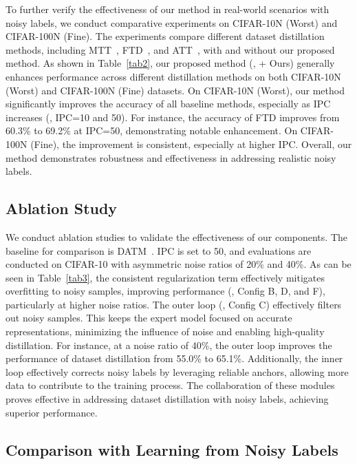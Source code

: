 
To further verify the effectiveness of our method in real-world scenarios with noisy labels, we conduct comparative experiments on CIFAR-10N (Worst) and CIFAR-100N (Fine).
The experiments compare different dataset distillation methods, including MTT~\cite{cazenavette2022distillation}, FTD~\cite{du2023minimizing}, and ATT~\cite{liu2024dataset}, with and without our proposed method.
As shown in Table~\ref{tab2}, our proposed method (\ie, + Ours) generally enhances performance across different distillation methods on both CIFAR-10N (Worst) and CIFAR-100N (Fine) datasets.
On CIFAR-10N (Worst), our method significantly improves the accuracy of all baseline methods, especially as IPC increases (\eg, IPC=10 and 50). 
For instance, the accuracy of FTD improves from 60.3\% to 69.2\% at IPC=50, demonstrating notable enhancement.
On CIFAR-100N (Fine), the improvement is consistent, especially at higher IPC. 
Overall, our method demonstrates robustness and effectiveness in addressing realistic noisy labels.


\subsection{Ablation Study}
We conduct ablation studies to validate the effectiveness of our components.
The baseline for comparison is DATM~\cite{guo2024lossless}. 
IPC is set to 50, and evaluations are conducted on CIFAR-10 with asymmetric noise ratios of 20\% and 40\%.
As can be seen in Table~\ref{tab3}, the consistent regularization term effectively mitigates overfitting to noisy samples, improving performance (\eg, Config B, D, and F), particularly at higher noise ratios.
The outer loop (\ie, Config C) effectively filters out noisy samples. 
This keeps the expert model focused on accurate representations, minimizing the influence of noise and enabling high-quality distillation.
For instance, at a noise ratio of 40\%, the outer loop improves the performance of dataset distillation from  55.0\% to 65.1\%.
Additionally, the inner loop effectively corrects noisy labels by leveraging reliable anchors, allowing more data to contribute to the training process.
The collaboration of these modules proves effective in addressing dataset distillation with noisy labels, achieving superior performance.




\subsection{Comparison with Learning from Noisy Labels}

